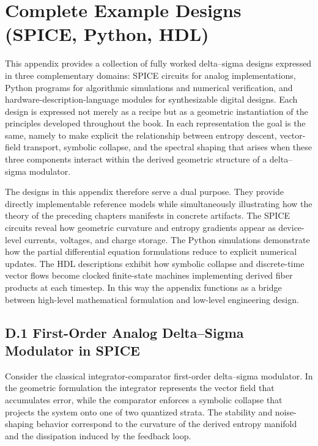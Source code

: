 
\chapter{Complete Example Designs (SPICE, Python, HDL)}

This appendix provides a collection of fully worked delta–sigma designs expressed in three complementary domains: SPICE circuits for analog implementations, Python programs for algorithmic simulations and numerical verification, and hardware-description-language modules for synthesizable digital designs. Each design is expressed not merely as a recipe but as a geometric instantiation of the principles developed throughout the book. In each representation the goal is the same, namely to make explicit the relationship between entropy descent, vector-field transport, symbolic collapse, and the spectral shaping that arises when these three components interact within the derived geometric structure of a delta–sigma modulator.

The designs in this appendix therefore serve a dual purpose. They provide directly implementable reference models while simultaneously illustrating how the theory of the preceding chapters manifests in concrete artifacts. The SPICE circuits reveal how geometric curvature and entropy gradients appear as device-level currents, voltages, and charge storage. The Python simulations demonstrate how the partial differential equation formulations reduce to explicit numerical updates. The HDL descriptions exhibit how symbolic collapse and discrete-time vector flows become clocked finite-state machines implementing derived fiber products at each timestep. In this way the appendix functions as a bridge between high-level mathematical formulation and low-level engineering design.

\section{D.1 First-Order Analog Delta–Sigma Modulator in SPICE}

Consider the classical integrator-comparator first-order delta–sigma modulator. In the geometric formulation the integrator represents the vector field that accumulates error, while the comparator enforces a symbolic collapse that projects the system onto one of two quantized strata. The stability and noise-shaping behavior correspond to the curvature of the derived entropy manifold and the dissipation induced by the feedback loop.

